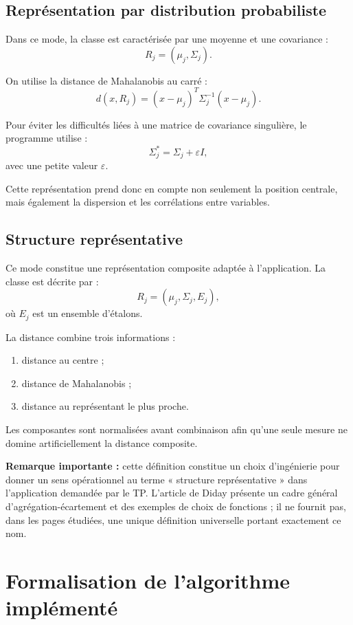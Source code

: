 \documentclass[12pt,a4paper]{article}
\begin{document}
\subsection{Représentation par distribution probabiliste}

Dans ce mode, la classe est caractérisée par une moyenne et une covariance :
\[
R_j=(\mu_j,\Sigma_j).
\]

On utilise la distance de Mahalanobis au carré :
\[
d(x,R_j)=
(x-\mu_j)^T\Sigma_j^{-1}(x-\mu_j).
\]

Pour éviter les difficultés liées à une matrice de covariance singulière, le programme utilise :
\[
\Sigma_j^*=\Sigma_j+\varepsilon I,
\]
avec une petite valeur $\varepsilon$.

Cette représentation prend donc en compte non seulement la position centrale, mais également la dispersion et les corrélations entre variables.

\subsection{Structure représentative}

Ce mode constitue une représentation composite adaptée à l'application. La classe est décrite par :
\[
R_j=(\mu_j,\Sigma_j,E_j),
\]
où $E_j$ est un ensemble d'étalons.

La distance combine trois informations :
\begin{enumerate}
    \item distance au centre ;
    \item distance de Mahalanobis ;
    \item distance au représentant le plus proche.
\end{enumerate}

Les composantes sont normalisées avant combinaison afin qu'une seule mesure ne domine artificiellement la distance composite.

\textbf{Remarque importante :} cette définition constitue un choix d'ingénierie pour donner un sens opérationnel au terme « structure représentative » dans l'application demandée par le TP. L'article de Diday présente un cadre général d'agrégation-écartement et des exemples de choix de fonctions ; il ne fournit pas, dans les pages étudiées, une unique définition universelle portant exactement ce nom.

\section{Formalisation de l'algorithme implémenté}
\end{document}
